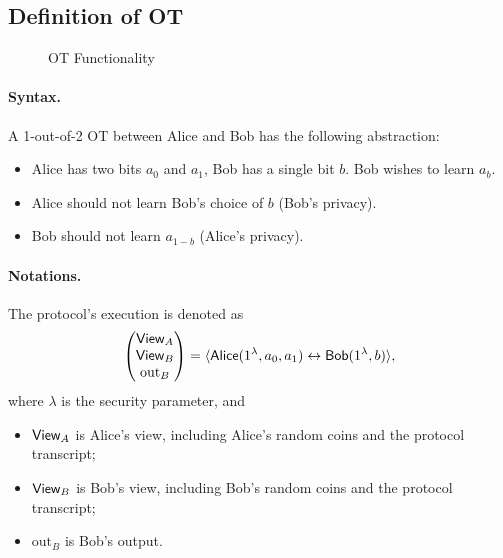 
\subsection{Definition of OT}

\begin{figure}[ht]
    \centering
    \caption{OT Functionality}
    \label{fig:protocol2}
\end{figure}

\paragraph{Syntax.}
A 1-out-of-2 OT between Alice and Bob has the following abstraction: 
\begin{itemize}
    \item Alice has two bits $a_0$ and $a_1$, Bob has a single bit $b$. Bob wishes
to learn $a_b$.
    \item Alice should not learn Bob's choice of $b$ (Bob's privacy).
    \item Bob should not learn $a_{1-b}$ (Alice's privacy).
\end{itemize}


\paragraph{Notations.}
The protocol's execution is denoted as 
\[
\begin{pmatrix}
    {\sf View}_{A} \\
    {\sf View}_{B} \\
    \text{out}_{B} 
\end{pmatrix}
=\langle {\sf Alice}(1^\lambda, a_0, a_1) \leftrightarrow {\sf Bob}(1^\lambda, b)\rangle,
\]
where
$\lambda$ is the security parameter, and 
\begin{itemize}
    \item ${\sf View}_{A}$ is Alice's view, including Alice's random coins and the protocol transcript;
    \item ${\sf View}_{B}$ is Bob's view, including Bob's random coins and the protocol transcript;
    \item $\text{out}_{B}$ is Bob's output. 
\end{itemize}

